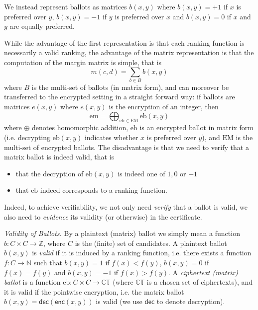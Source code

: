 \documentclass{llncs}
\newcommand{\Nat}{\mathbb{N}}
\newcommand{\Z}{\mathbb{Z}}
\newcommand{\encb}{\mathrm{eb}}
\newcommand{\EncB}{\mathrm{EM}}
\newcommand{\encm}{\mathrm{em}}
\newcommand{\CT}{\mathbb{CT}}
\newcommand{\dec}{\mathsf{dec}}
\newcommand{\enc}{\mathsf{enc}}
\begin{document}
We instead represent ballots as matrices
$b(x, y)$ where $b(x, y) = +1$ if $x$ is preferred
over $y$, $b(x, y) = -1$ if $y$ is preferred over $x$ and $b(x, y) =
0$ if $x$ and $y$ are equally preferred.

While the advantage of the first representation is that each ranking
function is necessarily a valid ranking, the advantage of the matrix 
representation is that the computation of
the margin matrix is simple, that is
\[ m(c, d) = \sum_{b \in B} b(x, y) \]
where $B$ is the multi-set of ballots (in matrix form), and can
moreover be transferred to the encrypted setting in a straight
forward way: if ballots are matrices $e(x,y)$ where $e(x,y)$ is the
encryption of an integer, then
\[ \encm = \bigoplus_{\encb \in \EncB} \encb(x, y) \]
where $\oplus$ denotes homomorphic addition, $\encb$ is an encrypted
ballot in matrix form (i.e. decrypting $\encb(x, y)$ indicates
whether $x$ is preferred over $y$), and $\EncB$ is the multi-set of
encrypted ballots. The disadvantage is that we need to verify that a
matrix ballot is indeed valid, that is
\begin{itemize}
\item that the decryption of $\encb(x, y)$ is indeed one of $1, 0$ or
$-1$
\item that $\encb$ indeed corresponds to a ranking function.
\end{itemize}

Indeed, to achieve verifiability, we not only need \emph{verify}
that a ballot is valid, we also need to \emph{evidence} its validity
(or otherwise) in the certificate.  

\smallskip\noindent\emph{Validity of Ballots.} By a plaintext
(matrix) ballot
we simply mean a function $b: C \times C \to \Z$,
where $C$ is the (finite) set of candidates. A 
plaintext ballot $b(x, y)$ 
is \emph{valid} if it is induced by a ranking function, i.e.
there exists a function $f: C \to \Nat$ such that $b(x, y) = 1$ if
$f(x) < f(y)$, $b(x, y) = 0$ if $f(x) = f(y)$ and $b(x, y) = -1$ if
$f(x) > f(y)$. A \emph{ciphertext (matrix) ballot} is a function
$\encb: C \times C \to \CT$ (where $\CT$ is a chosen set of
ciphertexts), and it is valid if the pointwise encryption, i.e. the
matrix ballot $b(x, y) = \dec(\enc(x,y))$ is valid (we use $\dec$ to
denote decryption). 
\end{document}
